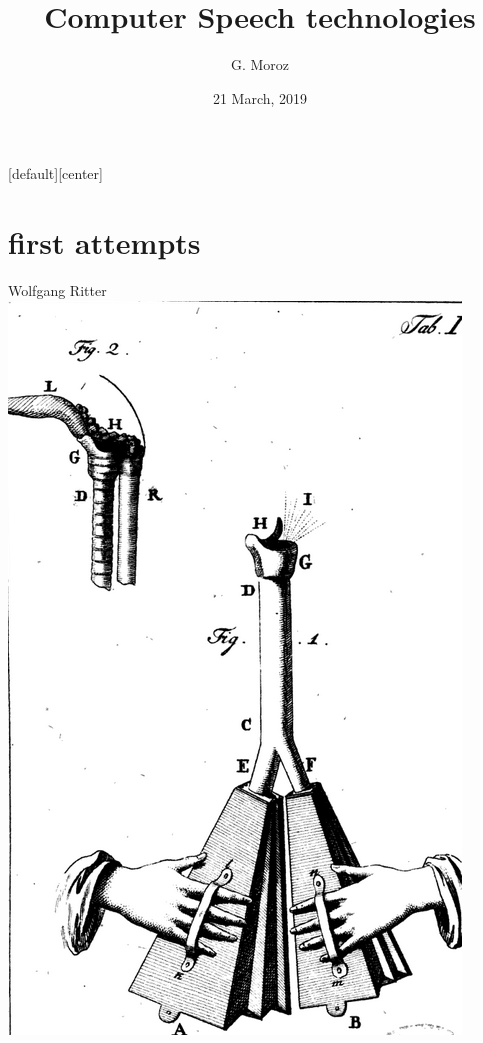 
[default][center]
\title[]{Computer Speech technologies}
\author[]{G. Moroz}
\date{21 March, 2019}

\frame{\titlepage}

\section{first attempts}

\begin{frame}{Wolfgang Ritter \href{https://books.google.ru/books?hl=pl&lr=&id=3MRJAAAAcAAJ&oi=fnd&pg=PA1&dq=Mechanismus+der+menschlichen+Sprache+nebst+Beschreibung+einer+sprechenden+Maschine&ots=MW2q1Xb0dG&sig=qwlXuPxE6P_Ruryv-FXckqV10Pk&redir_esc=y\#v=onepage&q=Mechanismus\%20der\%20menschlichen\%20Sprache\%20nebst\%20Beschreibung\%20einer\%20sprechenden\%20Maschine&f=false}{\cite[76]{kempelen91}}}
\centering
\includegraphics[width=0.45\linewidth]{01-kempelen}
\end{frame}

